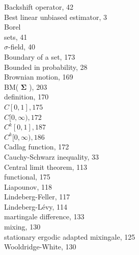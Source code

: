 \documentclass[10pt]{article}
\begin{document}
Backshift operator, 42\\
Best linear unbiased estimator, 3\\
Borel\\
sets, 41\\
$\sigma$-field, 40\\
Boundary of a set, 173\\
Bounded in probability, 28\\
Brownian motion, 169\\
BM( $\boldsymbol{\Sigma}$ ), 203\\
definition, 170\\
$C[0,1], 175$\\
$C[0, \infty), 172$\\
$C^{k}[0,1], 187$\\
$C^{k}[0, \infty), 186$\\
Cadlag function, 172\\
Cauchy-Schwarz inequality, 33\\
Central limit theorem, 113\\
functional, 175\\
Liapounov, 118\\
Lindeberg-Feller, 117\\
Lindeberg-Lévy, 114\\
martingale difference, 133\\
mixing, 130\\
stationary ergodic adapted mixingale, 125\\
Wooldridge-White, 130
\end{document}
